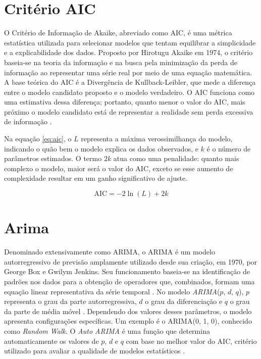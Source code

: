 \documentclass[12pt]{tcc}
\begin{document}
\section{Critério AIC}
\label{sec:aic}

O Critério de Informação de Akaike, abreviado como AIC, é uma métrica estatística utilizada para selecionar modelos que tentam equilibrar a simplicidade e a explicabilidade dos dados. Proposto por Hirotugu Akaike em 1974, o critério baseia-se na teoria da informação e na busca pela minimização da perda de informação ao representar uma série real por meio de uma equação matemática. A base teórica do AIC é a Divergência de Kullback-Leibler, que mede a diferença entre o modelo candidato proposto e o modelo verdadeiro. O AIC funciona como uma estimativa dessa diferença; portanto, quanto menor o valor do AIC, mais próximo o modelo candidato está de representar a realidade sem perda excessiva de informação \citep{vrieze2012model}.

Na equação \ref{eq:aic}, o $L$ representa a máxima verossimilhança do modelo, indicando o quão bem o modelo explica os dados observados, e $k$ é o número de parâmetros estimados. O termo $2k$ atua como uma penalidade: quanto mais complexo o modelo, maior será o valor do AIC, exceto se esse aumento de complexidade resultar em um ganho significativo de ajuste.

\begin{equation}
\text{AIC} = -2\ln(L) + 2k
\label{eq:aic}
\end{equation}

\section{Arima}
\label{sec:arima}

Denominado extensivamente como \acrlong{ARIMA}, o \gls{ARIMA} é um modelo autorregressivo de previsão amplamente utilizado desde sua criação, em 1970, por George Box e Gwilym Jenkins. Seu funcionamento baseia-se na identificação de padrões nos dados para a obtenção de operadores que, combinados, formam uma equação linear representativa da série temporal \citep{BoxJenkins1970}. No modelo \textit{ARIMA}($p$, $d$, $q$), $p$ representa o grau da parte autorregressiva, $d$ o grau da diferenciação e $q$ o grau da parte de média móvel \citep{sato_gerenciamento_2013, hyndman_automatic_2008}. Dependendo dos valores desses parâmetros, o modelo apresenta configurações específicas. Um exemplo é o ARIMA(0, 1, 0), conhecido como \textit{Random Walk}. O \textit{Auto ARIMA} é uma função que determina automaticamente os valores de $p$, $d$ e $q$ com base no melhor valor do AIC, critério utilizado para avaliar a qualidade de modelos estatísticos \citep{hyndman_automatic_2008}.
\end{document}
